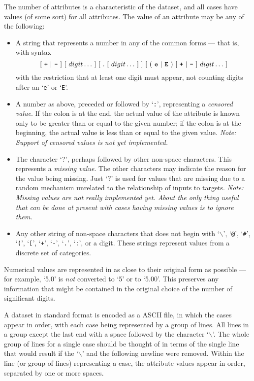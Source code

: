 The number of attributes is a characteristic of the dataset, and all cases 
have values (of some sort) for all attributes.  The value of an attribute
may be any of the following:\vspace{-5pt}
\begin{itemize} 
\item A string that represents a number in any of the common forms
      --- that is, with syntax
      \[
         [\ \mbox{\tt +}\ |\ \mbox{\tt -} \ ]\ 
         [\ digit\ldots\ ]\ [\ {\tt .}\ [\ digit\ldots\ ]\ ]\
         [\ (\ \mbox{\tt e}\ |\ \mbox{\tt E}\ )\ 
         [\ \mbox{\tt +}\ |\ \mbox{\tt -}\ ]\ digit\ldots\ ]
      \]
      with the restriction that at least one digit must appear, not 
      counting digits after an `{\tt e}' or `{\tt E}'.
\item A number as above, preceded or followed by `{\tt :}',
      representing a \emph{censored value}.  If the colon is at the end,
      the actual value of the attribute is known only to be greater than
      or equal to the given number; if the colon is at the beginning, the
      actual value is less than or equal to the given value. \emph{Note:
      Support of censored values is not yet implemented.}
\item The character `?', perhaps followed by other non-space characters.
      This represents a \emph{missing value}.
      The other characters may indicate the reason for the value being 
      missing.  Just `?' is used for values that are missing due to
      a random mechanism unrelated to the relationship of inputs to targets. 
      \emph{Note: Missing values are not really implemented yet. About the only
      thing useful that can be done at present with cases having missing 
      values is to ignore them.}
\item Any other string of non-space characters that does not begin with
      `{\tt $\backslash$}', `{\tt @}', `{\tt \#}', `{\tt (}', 
      `{\tt [}', `{\tt +}', `{\tt -}', `{\tt .}', `{\tt :}', 
      or a digit. These strings represent values from a discrete set of 
      categories.
\end{itemize}\vspace{-5pt}
Numerical values are represented in as close to their original form as
possible --- for example, `5.0' is \emph{not} converted to `5' or to
`5.00'.  This preserves any information that might be contained in the
original choice of the number of significant digits.

A dataset in standard format is encoded as a ASCII file, in which the
cases appear in order, with each case being represented by a group of
lines.  All lines in a group except the last end with a space followed
by the character `{\tt $\backslash$}'.  The whole group of lines for a
single case should be thought of in terms of the single line that
would result if the `{\tt $\backslash$}' and the following newline were
removed.  Within the line (or group of lines) representing a case, the
attribute values appear in order, separated by one or more spaces.

